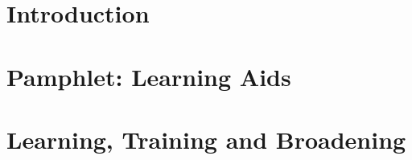 \documentclass[../main.tex]{subfiles}
\begin{document}
\chapter{Introduction}

\chapter{Pamphlet: Learning Aids}

\chapter{Learning, Training and Broadening}

\end{document}
